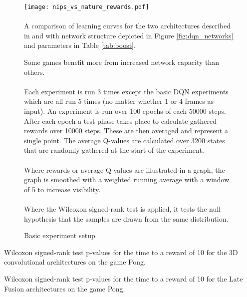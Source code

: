 \begin{figure}[htpb]
  \centering
  \texttt{[image: nips\_vs\_nature\_rewards.pdf]}
  \raggedright
  \paragraph{}
    A comparison of learning curves for the two architectures described in
    \cite{Mnih2013} and \cite{Mnih2015}
    with network structure depicted in Figure \ref{fig:dqn_networks}
    and parameters in Table \ref{tab:boost}.

    Some games benefit more from increased network capacity than others.
  \label{fig:nips_vs_nature_rewards}
\end{figure}

\begin{figure}[]
  \paragraph{}
  Each experiment is run 3 times
  except the basic DQN experiments which are all run 5 times
  (no matter whether 1 or 4 frames as input).
  An experiment is run over 100 epochs of each 50000 steps.
  After each epoch a test phase takes place to calculate gathered rewards
  over 10000 steps.
  These are then averaged and represent a single point.
  The average Q-values are calculated over 3200 states
  that are randomly gathered at the start of the experiment.

  \paragraph{}
  Where rewards or average Q-values are illustrated in a graph,
  the graph is smoothed with a weighted running average
  with a window of 5
  to increase visibility.

  \paragraph{}
  Where the Wilcoxon signed-rank test is applied,
  it tests the null hypothesis that the samples
  are drawn from the same distribution.

  \caption{Basic experiment setup}
  \label{fig:basic_setup}
\end{figure}

\begin{table}
  \center
  \renewcommand{\arraystretch}{1.3}
  
  \caption[Statistical results for 3D Conv]{
    Wilcoxon signed-rank test p-values
    for the time to a reward of 10
    for the 3D convolutional architectures
    on the game Pong.
  }
  \label{tab:conv3d_wilcoxon}
\end{table}


\begin{table}
  \center
  \renewcommand{\arraystretch}{1.3}
  
  \caption[Statistical results for Late Fusion]{
    Wilcoxon signed-rank test p-values
    for the time to a reward of 10
    for the Late Fusion architectures
    on the game Pong.
  }
  \label{tab:lf_wilcoxon}
\end{table}
